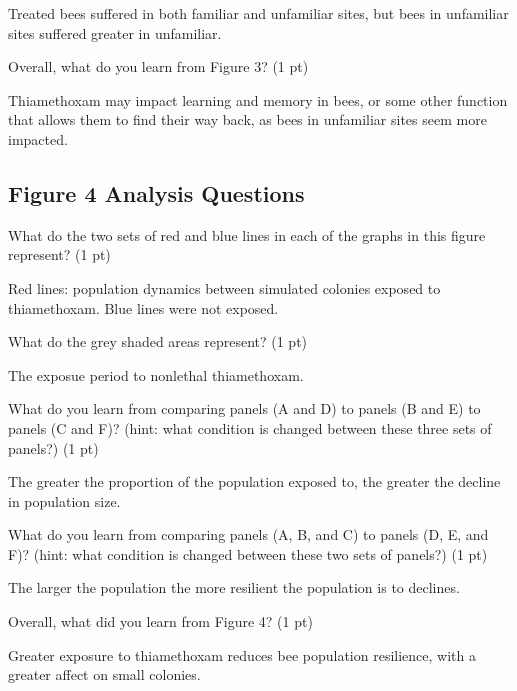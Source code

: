 \documentclass[12pt,a4paper]{article}
\begin{document}
\begin{enumerate}[font=\bfseries, wide, resume]
    Treated bees suffered in both familiar and unfamiliar sites, but bees in unfamiliar sites suffered greater in unfamiliar.

    {\color{under}\item Overall, what do you learn from Figure 3? (1 pt)}
    
    Thiamethoxam may impact learning and memory in bees, or some other function that allows them to find their way back, as bees in unfamiliar sites seem more impacted. 

    \subsection*{Figure 4 Analysis Questions}
    {\color{under}\item  What do the two sets of red and blue lines in each of the graphs in this figure represent? (1 pt)}
    
    Red lines: population dynamics between simulated colonies exposed to thiamethoxam. Blue lines were not exposed.

    {\color{under}\item What do the grey shaded areas represent? (1 pt)}
    
    The exposue period to nonlethal thiamethoxam.
    
    {\color{under}\item What do you learn from comparing panels (A and D) to panels (B and E) to panels (C and F)? (hint: what condition is changed between these three sets of panels?) (1 pt)}

    The greater the proportion of the population exposed to, the greater the decline in population size. 

    {\color{under}\item What do you learn from comparing panels (A, B, and C) to panels (D, E, and F)? (hint: what condition is changed between these two sets of panels?) (1 pt)}
    
    The larger the population the more resilient the population is to declines. 

    {\color{under}\item  Overall, what did you learn from Figure 4? (1 pt)}

    Greater exposure to thiamethoxam reduces bee population resilience, with a greater affect on small colonies.
\end{enumerate}
    
\end{document}
